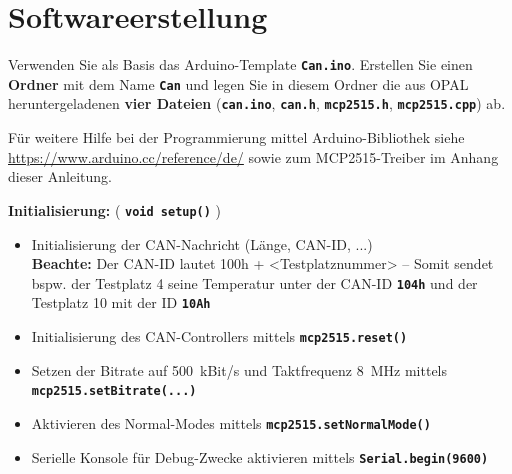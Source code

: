 \documentclass[
    fontsize=12pt,                      %
    paper=a4,                           %
    twoside=off,                       %
    DIV=15,                             %
    BCOR=12mm,                          %
    headings=normal,                    %
    headsepline=false,                   %
    footsepline=false,                  %
    headinclude=true,                   %
    footinclude=false,                  %
    toc=listof,                         %
    toc=bib,                            %
    chapterprefix=false,                %
    appendixprefix=false,               %
    numbers=noendperiod,                %
    captions=tableabove,                %
    footnotes=multiple,                 %
    bibliography=oldstyle,              %
    draft=false,                        %
]{scrreprt}
\newcommand{\Farbcode}[1]{\texttt{\textbf{\textcolor{myred}{#1}}}}
\begin{document}
\section*{Softwareerstellung} 

Verwenden Sie als Basis das Arduino-Template \Farbcode{Can.ino}. Erstellen Sie einen \textbf{Ordner} mit dem Name \Farbcode{Can} und legen Sie in diesem Ordner die aus OPAL heruntergeladenen \textbf{vier Dateien} (\Farbcode{can.ino}, \Farbcode{can.h}, \Farbcode{mcp2515.h}, \Farbcode{mcp2515.cpp}) ab.

Für weitere Hilfe bei der Programmierung mittel Arduino-Bibliothek siehe  \url{https://www.arduino.cc/reference/de/} sowie zum MCP2515-Treiber im Anhang dieser Anleitung.
\vskip 0.2cm

\noindent
\textbf{Initialisierung:} ( \Farbcode{void setup()} )
\begin{itemize}
\item Initialisierung der CAN-Nachricht (Länge, CAN-ID, ...) \\
\textbf{Beachte:} Der CAN-ID lautet 100h + <Testplatznummer> -- Somit sendet bspw. der Testplatz 4 seine Temperatur unter der CAN-ID \texttt{\textbf{104h}} und der Testplatz 10 mit der ID \texttt{\textbf{10Ah}}
\item Initialisierung des CAN-Controllers mittels \Farbcode{mcp2515.reset()}
\item Setzen der Bitrate auf 500~kBit/s und Taktfrequenz 8~MHz mittels \\ \Farbcode{mcp2515.setBitrate(...)}
\item Aktivieren des Normal-Modes mittels \Farbcode{mcp2515.setNormalMode()}
\item Serielle Konsole für Debug-Zwecke aktivieren mittels \Farbcode{Serial.begin(9600)}
\end{itemize}
\end{document}
